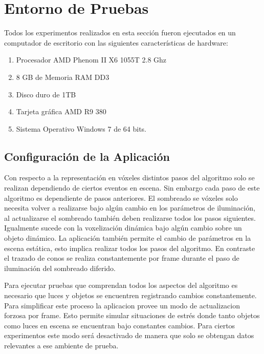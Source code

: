 \section{Entorno de Pruebas}
Todos los experimentos realizados en esta sección fueron ejecutados en un computador de escritorio con las siguientes características de hardware:

\begin{enumerate}
    \item Procesador AMD Phenom II X6 1055T 2.8 Ghz
    \item 8 GB de Memoria RAM DD3
    \item Disco duro de 1TB 
    \item Tarjeta gráfica AMD R9 380
    \item Sistema Operativo Windows 7 de 64 bits.
\end{enumerate}

\subsection{Configuración de la Aplicación}

Con respecto a la representación en vóxeles distintos pasos del algoritmo solo se realizan dependiendo de ciertos eventos en escena. Sin embargo cada paso de este algoritmo es dependiente de pasos anteriores. El sombreado se vóxeles solo necesita volver a realizarse bajo algún cambio en los parámetros de iluminación, al actualizarse el sombreado también deben realizarse todos los pasos siguientes. Igualmente sucede con la voxelización dinámica bajo algún cambio sobre un objeto dinámico. La aplicación también permite el cambio de parámetros en la escena estática, esto implica realizar todos los pasos del algoritmo. En contraste el trazado de conos se realiza constantemente por frame durante el paso de iluminación del sombreado diferido.

Para ejecutar pruebas que comprendan todos los aspectos del algoritmo es necesario que luces y objetos se encuentren registrando cambios constantemente. Para simplificar este proceso la aplicacion provee un modo de actualizacion forzosa por frame. Esto permite simular situaciones de estrés donde tanto objetos como luces en escena se encuentran bajo constantes cambios. Para ciertos experimentos este modo será desactivado de manera que solo se obtengan datos relevantes a ese ambiente de prueba.